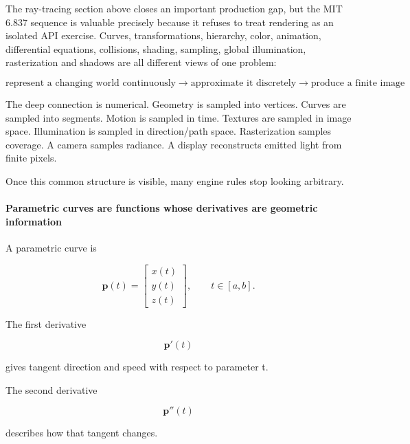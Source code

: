 \hypertarget{03-visual-computing-i-ch001-mit-graphics-gap-closure-the-renderer-is-one-continuous-numerical-model-from-shape-to-motion-to-light-to-pixels}{}

The ray-tracing section above closes an important production gap, but the MIT 6.837 sequence is valuable precisely because it refuses to treat rendering as an isolated API exercise. Curves, transformations, hierarchy, color, animation, differential equations, collisions, shading, sampling, global illumination, rasterization and shadows are all different views of one problem:

\[
\boxed{
\text{represent a changing world continuously}
\rightarrow
\text{approximate it discretely}
\rightarrow
\text{produce a finite image}
}
\]

The deep connection is numerical. Geometry is sampled into vertices. Curves are sampled into segments. Motion is sampled in time. Textures are sampled in image space. Illumination is sampled in direction/path space. Rasterization samples coverage. A camera samples radiance. A display reconstructs emitted light from finite pixels.

Once this common structure is visible, many engine rules stop looking arbitrary.

\paragraph{Parametric curves are functions whose derivatives are geometric information}\label{03-visual-computing-i-ch001-parametric-curves-are-functions-whose-derivatives-are-geometric-information}

\hypertarget{03-visual-computing-i-ch001-parametric-curves-are-functions-whose-derivatives-are-geometric-information}{}

A parametric curve is

\[
\mathbf p(t)=
\begin{bmatrix}
x(t)\\
y(t)\\
z(t)
\end{bmatrix},
\qquad
t\in[a,b].
\]

The first derivative

\[
\mathbf p'(t)
\]

gives tangent direction and speed with respect to parameter t.

The second derivative

\[
\mathbf p''(t)
\]

describes how that tangent changes.

